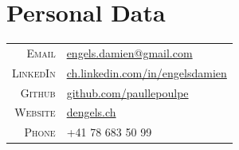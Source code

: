 \documentclass[a4paper,11pt]{article} %
\begin{document}



\section{Personal Data}
\begin{center}
\begin{tabular}{rl}
\textsc{Email} & 
\href{mailto:engels.damien@gmail.com}{engels.damien@gmail.com} \\

\textsc{LinkedIn} & 
\href{http://ch.linkedin.com/in/engelsdamien}{ch.linkedin.com/in/engelsdamien}\\

\textsc{Github} & 
\href{https://github.com/paullepoulpe}{github.com/paullepoulpe}\\

\textsc{Website} & 
\href{http://dengels.ch}{dengels.ch}\\

\textsc{Phone} & +41 78 683 50 99\\
\end{tabular}
\end{center}
\end{document}
